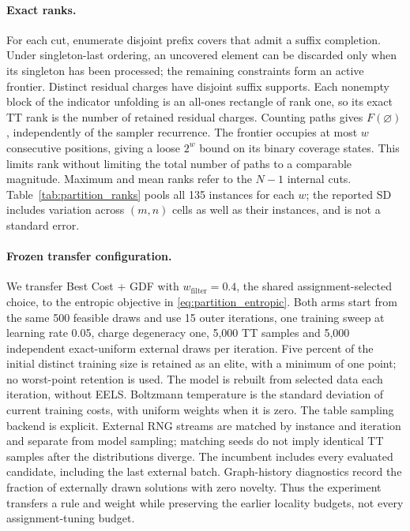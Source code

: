 \paragraph{Exact ranks.}
For each cut, enumerate disjoint prefix covers that admit a suffix completion.
Under singleton-last ordering, an uncovered element can be discarded only
when its singleton has been processed; the remaining constraints form an
active frontier. Distinct residual charges have disjoint suffix supports.
Each nonempty block of the indicator unfolding is an all-ones rectangle of
rank one, so its exact TT rank is the number of retained residual charges.
Counting paths gives $F(\varnothing)$, independently of the sampler recurrence.
The frontier occupies at most $w$ consecutive positions, giving a loose
$2^w$ bound on its binary coverage states. This limits rank without limiting
the total number of paths to a comparable magnitude. Maximum and mean ranks
refer to the $N-1$ internal cuts. Table~\ref{tab:partition_ranks} pools all 135
instances for each $w$; the reported SD includes variation across $(m,n)$ cells
as well as their instances, and is not a standard error.


\paragraph{Frozen transfer configuration.}
We transfer Best Cost + GDF with $w_{\mathrm{filter}}=0.4$, the shared
assignment-selected choice, to the entropic objective in
\cref{eq:partition_entropic}. Both arms start from the same 500 feasible draws
and use 15 outer iterations, one training sweep at learning rate 0.05,
charge degeneracy one, 5,000 TT samples and 5,000 independent exact-uniform
external draws per iteration. Five percent of the initial distinct training
size is retained as an elite, with a minimum of one point; no worst-point
retention is used. The model is rebuilt from selected data each iteration,
without EELS. Boltzmann temperature is the standard deviation of current
training costs, with uniform weights when it is zero. The table sampling
backend is explicit. External RNG streams are matched by instance and iteration
and separate from model sampling; matching seeds do not imply identical
TT samples after the distributions diverge. The incumbent includes every
evaluated candidate, including the last external batch. Graph-history
diagnostics record the fraction of externally drawn solutions with zero
novelty. Thus the experiment transfers a rule and weight while preserving
the earlier locality budgets, not every assignment-tuning budget.


